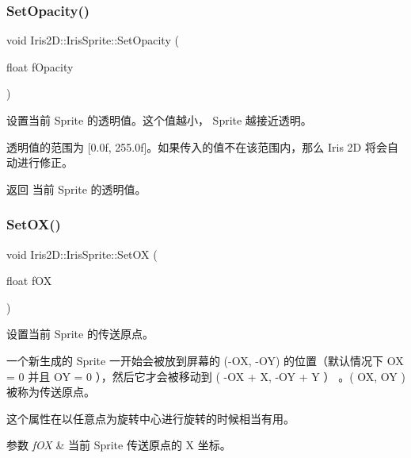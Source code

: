 \subsubsection{\texorpdfstring{Set\+Opacity()}{SetOpacity()}}
{\footnotesize\ttfamily void Iris2\+D\+::\+Iris\+Sprite\+::\+Set\+Opacity (\begin{DoxyParamCaption}\item[{float}]{f\+Opacity }\end{DoxyParamCaption})}



设置当前 Sprite 的透明值。这个值越小， Sprite 越接近透明。 

透明值的范围为 \mbox{[}0.\+0f, 255.\+0f\mbox{]}。如果传入的值不在该范围内，那么 Iris 2D 将会自动进行修正。

\begin{DoxyReturn}{返回}
当前 Sprite 的透明值。 
\end{DoxyReturn}
\mbox{\label{class_iris2_d_1_1_iris_sprite_ae4b2cbedd03a92ac0b68b9e701df2e68}} 
\subsubsection{\texorpdfstring{Set\+O\+X()}{SetOX()}}
{\footnotesize\ttfamily void Iris2\+D\+::\+Iris\+Sprite\+::\+Set\+OX (\begin{DoxyParamCaption}\item[{float}]{f\+OX }\end{DoxyParamCaption})}



设置当前 Sprite 的传送原点。 

一个新生成的 Sprite 一开始会被放到屏幕的 (-\/\+OX, -\/\+OY) 的位置（默认情况下 OX = 0 并且 OY = 0 ），然后它才会被移动到 ( -\/\+OX + X, -\/\+OY + Y ） 。( O\+X, O\+Y ) 被称为传送原点。

这个属性在以任意点为旋转中心进行旋转的时候相当有用。 
\begin{DoxyParams}{参数}
{\em f\+OX} & 当前 Sprite 传送原点的 X 坐标。 \\
\hline
\end{DoxyParams}
\mbox{\label{class_iris2_d_1_1_iris_sprite_a6dba8492659c67a9c09359ed321a89b3}} 
